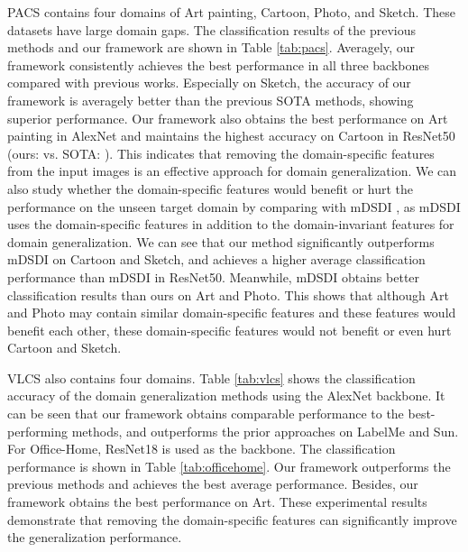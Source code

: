\documentclass{article}
\begin{document}
PACS contains four domains of Art painting, Cartoon, Photo, and Sketch. These datasets have large domain gaps. The classification results of the previous methods and our framework are shown in Table \ref{tab:pacs}. Averagely, our framework consistently achieves the best performance in all three backbones compared with previous works. Especially on Sketch, the accuracy of our framework is averagely  better than the previous SOTA methods, showing superior performance. Our framework also obtains the best performance on Art painting in AlexNet and maintains the highest accuracy on Cartoon in ResNet50 (ours:  vs. SOTA: ). This indicates that removing the domain-specific features from the input images is an effective approach for domain generalization. We can also study whether the domain-specific features would benefit or hurt the performance on the unseen target domain by comparing with mDSDI \cite{bui2021exploiting}, as mDSDI uses the domain-specific features in addition to the domain-invariant features for domain generalization. We can see that our method significantly outperforms mDSDI on Cartoon and Sketch, and achieves a higher average classification performance than mDSDI in ResNet50. Meanwhile, mDSDI obtains better classification results than ours on Art and Photo. This shows that although Art and Photo may contain similar domain-specific features and these features would benefit each other, these domain-specific features would not benefit or even hurt Cartoon and Sketch. 

VLCS also contains four domains. Table \ref{tab:vlcs} shows the classification accuracy of the domain generalization methods using the AlexNet backbone. It can be seen that our framework obtains comparable performance to the best-performing methods, and outperforms the prior approaches on LabelMe and Sun. For Office-Home, ResNet18 is used as the backbone. The classification performance is shown in Table \ref{tab:officehome}. Our framework outperforms the previous methods and achieves the best average performance. Besides, our framework obtains the best performance on Art. These experimental results demonstrate that removing the domain-specific features can significantly improve the generalization performance.
\end{document}
